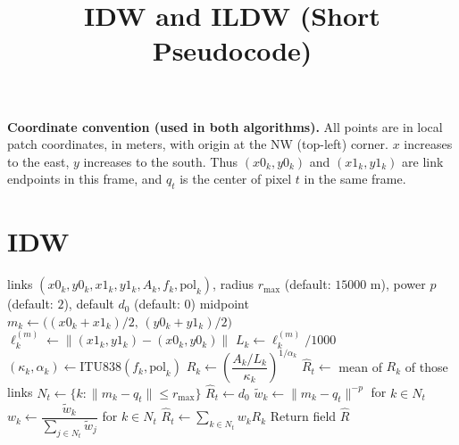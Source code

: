 \documentclass[11pt]{article}
\title{IDW and ILDW (Short Pseudocode)}
\date{}
\begin{document}
\maketitle

\noindent\textbf{Coordinate convention (used in both algorithms).}
All points are in local patch coordinates, in meters, with origin at the NW (top-left) corner.
$x$ increases to the east, $y$ increases to the south.
Thus $(x0_k,y0_k)$ and $(x1_k,y1_k)$ are link endpoints in this frame, and $q_t$ is the center of pixel $t$ in the same frame.

\section*{IDW}
\begin{algorithm}[h]
\caption{Discretized Midpoint IDW}
\begin{algorithmic}[1]
\Require links $(x0_k,y0_k,x1_k,y1_k,A_k,f_k,\text{pol}_k)$, radius $r_{\max}$ (default: $15000$ m), power $p$ (default: $2$), default $d_0$ (default: $0$)
\State midpoint $m_k \gets \big((x0_k+x1_k)/2,\,(y0_k+y1_k)/2\big)$
\State $\ell_k^{(m)} \gets \| (x1_k,y1_k)-(x0_k,y0_k) \|$ 
\State $L_k \gets \ell_k^{(m)}/1000$ 
\State $(\kappa_k,\alpha_k) \gets \mathrm{ITU838}(f_k,\text{pol}_k)$
\State $R_k \gets \left(\dfrac{A_k/L_k}{\kappa_k}\right)^{1/\alpha_k}$ 
\EndFor
{}
\State $\hat R_t \gets$ mean of $R_k$ of those links
\Else
\State $N_t \gets \{k:\|m_k-q_t\|\le r_{\max}\}$
\State $\hat R_t \gets d_0$
\Else
\State $\tilde w_k \gets \|m_k-q_t\|^{-p}$ for $k\in N_t$
\State $w_k \gets \dfrac{\tilde w_k}{\sum_{j\in N_t}\tilde w_j}$ for $k\in N_t$
\State $\hat R_t \gets \sum_{k\in N_t} w_k R_k$
\EndIf
\EndIf
\EndFor
\State Return field $\hat R$
\end{algorithmic}
\end{algorithm}
\end{document}

